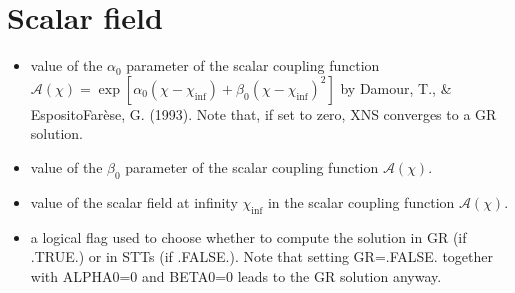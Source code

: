 \documentclass[letterpaper,10pt,english]{sphinxmanual}
\begin{document}
\section{Scalar field}
\label{\detokenize{user_params:scalar-field}}\begin{itemize}
\item {} 
\sphinxAtStartPar
{} \sphinxhyphen{} value of the \(\alpha _0\) parameter of the scalar coupling function \(\mathcal{A}(\chi)=\exp [ \alpha_0 (\chi - \chi _\mathrm{inf}) + \beta _0 (\chi - \chi _\mathrm{inf})^2 ]\) by Damour, T., \& Esposito\sphinxhyphen{}Farèse, G. (1993). Note that, if set to zero, XNS converges to a GR solution.


\item {} 
\sphinxAtStartPar
{} \sphinxhyphen{} value of the \(\beta _0\) parameter of the scalar coupling function \(\mathcal{A}(\chi)\).


\item {} 
\sphinxAtStartPar
{} \sphinxhyphen{} value of the scalar field at infinity \(\chi _\mathrm{inf}\) in the scalar coupling function \(\mathcal{A}(\chi)\).

\item {} 
\sphinxAtStartPar
{} \sphinxhyphen{} a logical flag used to choose whether to compute the solution in GR (if .TRUE.) or in STTs (if .FALSE.). Note that setting GR=.FALSE. together with ALPHA0=0 and BETA0=0 leads to the GR solution anyway.

\end{itemize}
\end{document}
